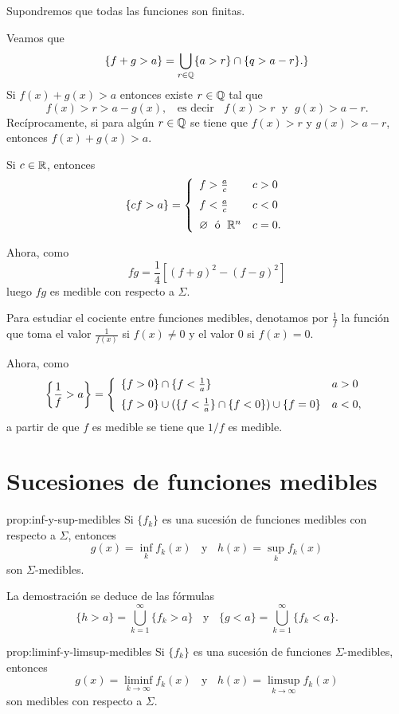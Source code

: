 \begin{demo}
Supondremos que todas las funciones son finitas.

Veamos que 
\[
\{
f+g>a\}=\bigcup\limits_{r \in \mathbb{Q}} \{ a>r\} \cap \{q>a-r\}.
\}
\]
Si $f(x)+g(x)>a$ entonces existe $r \in \mathbb{Q}$ tal que 
\[
f(x)>r>a-g(x),\;\;\mbox{ es decir }\;\; 
f(x)>r\;\mbox{ y }\; g(x)>a-r.
\]
Rec\'iprocamente, si para alg\'un $r\in \mathbb{Q}$ se tiene que $f(x)>r$ y $g(x)>a-r$, entonces $f(x)+g(x)>a$.

Si $c\in \mathbb{R}$, entonces
\[
\{cf>a\}=
\left\{
\begin{array}{ll}
f>\frac{a}{c}&c>0
\medskip
\\
f<\frac{a}{c}&c<0
\medskip
\\
\emptyset\;\mbox{ \'o }\;\rr^n &c=0.
\end{array}
\right.
\]

Ahora, como 
\[
fg=\frac{1}{4}[(f+g)^2-(f-g)^2]
\]
luego $fg$ es medible con respecto a $\Sigma$. 

Para estudiar el cociente entre funciones medibles, denotamos por $\frac{1}{f}$
la funci\'on que toma el valor $\frac{1}{f(x)}$ si $f(x)\neq 0$ y el valor $0$ si $f(x)=0$.

Ahora, como 
\[
\left\{\frac{1}{f}>a\right\}
=
\left \{
\begin{array}{ll}
 \{f>0\} \cap \{f<\frac{1}{a}\}    &  a>0 
 \medskip
 \\
 \{ f>0\} \cup  (\{f<\frac{1}{a}\} \cap \{f<0\}) \cup \{f=0\}
     & a<0, 
\end{array}
\right.
\]
a partir de que $f$ es medible se tiene que  $1/f$ es medible. 
\end{demo}

\section{Sucesiones de funciones medibles}

\begin{proposicion}{prop:inf-y-sup-medibles}
Si $\{f_k\}$ es una sucesi\'on de funciones medibles con respecto a $\Sigma$, 
entonces
\[
g(x)=\inf\limits_{k} f_k(x) \;\;\mbox{ y }\;\; h(x)=\sup\limits_{k} f_k(x) 
\]
son $\Sigma$-medibles. 
\end{proposicion}


La demostraci\'on se deduce de las f\'ormulas
\[
\{h>a \}=\bigcup_{k=1}^{\infty} \{f_k>a\}
\;\;\mbox{ y }\;\;
\{g<a \}=\bigcup_{k=1}^{\infty} \{f_k<a\}.
\]

\begin{proposicion}{prop:liminf-y-limsup-medibles}
Si $\{f_k\}$ es una sucesi\'on de funciones $\Sigma$-medibles, entonces
\[
g(x)=\liminf\limits_{k \to \infty} f_k(x)
\;\;\mbox{ y }
\;\;
h(x)=\limsup\limits_{k \to \infty} f_k(x)
\]
son   medibles con respecto a $\Sigma$.
\end{proposicion}


